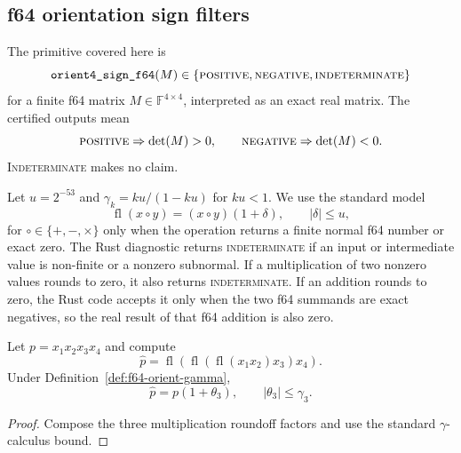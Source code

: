 %
%

\providecommand{\fl}{\operatorname{fl}}

\subsection{f64 orientation sign filters}

The primitive covered here is
\[
  \texttt{orient4\_sign\_f64}(M)
  \in \{\textsc{positive},\textsc{negative},\textsc{indeterminate}\}
\]
for a finite f64 matrix $M\in\mathbb{F}^{4\times4}$, interpreted as an exact
real matrix.  The certified outputs mean
\[
  \textsc{positive}\Rightarrow \det(M)>0,\qquad
  \textsc{negative}\Rightarrow \det(M)<0.
\]
\textsc{Indeterminate} makes no claim.

\begin{definition}\label{def:f64-orient-gamma}
Let $u=2^{-53}$ and $\gamma_k=ku/(1-ku)$ for $ku<1$.
We use the standard model
\[
  \fl(x\circ y)=(x\circ y)(1+\delta),\qquad |\delta|\le u,
\]
for $\circ\in\{+,-,\times\}$ only when the operation returns a finite normal f64
number or exact zero.  The Rust diagnostic returns \textsc{indeterminate} if an
input or intermediate value is non-finite or a nonzero subnormal.  If a
multiplication of two nonzero values rounds to zero, it also returns
\textsc{indeterminate}.  If an addition rounds to zero, the Rust code accepts
it only when the two f64 summands are exact negatives, so the real result of
that f64 addition is also zero.
\end{definition}

\begin{lemma}\label{lem:f64-orient-product-error}
Let $p=x_1x_2x_3x_4$ and compute
\[
  \hat p=\fl(\fl(\fl(x_1x_2)x_3)x_4).
\]
Under Definition~\ref{def:f64-orient-gamma},
\[
  \hat p=p(1+\theta_3),\qquad |\theta_3|\le\gamma_3.
\]
\end{lemma}

\begin{proof}
Compose the three multiplication roundoff factors and use the standard
$\gamma$-calculus bound.
\end{proof}

